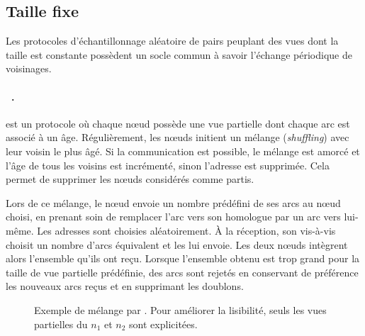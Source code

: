 \subsection{Taille fixe}
\label{net:subsec:fixed}

Les protocoles d'échantillonnage aléatoire de pairs peuplant des vues dont la
taille est constante possèdent un socle commun à savoir l'échange périodique
de voisinages.

\paragraph{\CYCLON~\cite{voulgaris2005cyclon}.} \CYCLON est un protocole où
chaque nœud possède une vue partielle dont chaque arc est associé à un
âge. Régulièrement, les nœuds initient un mélange (\emph{shuffling}) avec leur
voisin le plus âgé. Si la communication est possible, le mélange est amorcé et
l'âge de tous les voisins est incrémenté, sinon l'adresse est supprimée. Cela
permet de supprimer les nœuds considérés comme partis.

\noindent Lors de ce mélange, le nœud envoie un nombre prédéfini de ses arcs au
nœud choisi, en prenant soin de remplacer l'arc vers son homologue par un arc
vers lui-même. Les adresses sont choisies aléatoirement. À la réception, son
vis-à-vis choisit un nombre d'arcs équivalent et les lui envoie. Les deux nœuds
intègrent alors l'ensemble qu'ils ont reçu. Lorsque l'ensemble obtenu est trop
grand pour la taille de vue partielle prédéfinie, des arcs sont rejetés en
conservant de préférence les nouveaux arcs reçus et en supprimant les doublons.
  
\begin{figure}
  \centering
  \hspace{35pt}
  \caption[Exemple de mélange dans \CYCLON]
  {\label{net:fig:cyclonexample} Exemple de mélange par \CYCLON. Pour
    améliorer la lisibilité, seuls les vues partielles du $n_1$ et $n_2$ sont
    explicitées.}
\end{figure}
  
